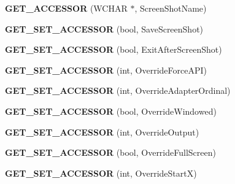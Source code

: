 \begin{DoxyCompactItemize}
\item 
\hypertarget{class_d_x_u_t_state_a7c580eede73b2b3625b5d5b40f757765}{{\bfseries G\+E\+T\+\_\+\+A\+C\+C\+E\+S\+S\+O\+R} (W\+C\+H\+A\+R $\ast$, Screen\+Shot\+Name)}\label{class_d_x_u_t_state_a7c580eede73b2b3625b5d5b40f757765}

\item 
\hypertarget{class_d_x_u_t_state_a6cc368c35ae95383e8e4bba48c1cc520}{{\bfseries G\+E\+T\+\_\+\+S\+E\+T\+\_\+\+A\+C\+C\+E\+S\+S\+O\+R} (bool, Save\+Screen\+Shot)}\label{class_d_x_u_t_state_a6cc368c35ae95383e8e4bba48c1cc520}

\item 
\hypertarget{class_d_x_u_t_state_ac2bbe60ebd3be440b9f12b5b59cb7cf6}{{\bfseries G\+E\+T\+\_\+\+S\+E\+T\+\_\+\+A\+C\+C\+E\+S\+S\+O\+R} (bool, Exit\+After\+Screen\+Shot)}\label{class_d_x_u_t_state_ac2bbe60ebd3be440b9f12b5b59cb7cf6}

\item 
\hypertarget{class_d_x_u_t_state_af3475e8ab68d3ea120cbe28eb42890e1}{{\bfseries G\+E\+T\+\_\+\+S\+E\+T\+\_\+\+A\+C\+C\+E\+S\+S\+O\+R} (int, Override\+Force\+A\+P\+I)}\label{class_d_x_u_t_state_af3475e8ab68d3ea120cbe28eb42890e1}

\item 
\hypertarget{class_d_x_u_t_state_a7cbe2c1ea6f043e22f885897980ec6d5}{{\bfseries G\+E\+T\+\_\+\+S\+E\+T\+\_\+\+A\+C\+C\+E\+S\+S\+O\+R} (int, Override\+Adapter\+Ordinal)}\label{class_d_x_u_t_state_a7cbe2c1ea6f043e22f885897980ec6d5}

\item 
\hypertarget{class_d_x_u_t_state_aeca780e3adb83245c49adbe25fc9890d}{{\bfseries G\+E\+T\+\_\+\+S\+E\+T\+\_\+\+A\+C\+C\+E\+S\+S\+O\+R} (bool, Override\+Windowed)}\label{class_d_x_u_t_state_aeca780e3adb83245c49adbe25fc9890d}

\item 
\hypertarget{class_d_x_u_t_state_a5380b95bee31d723e4cb5e90aaefd814}{{\bfseries G\+E\+T\+\_\+\+S\+E\+T\+\_\+\+A\+C\+C\+E\+S\+S\+O\+R} (int, Override\+Output)}\label{class_d_x_u_t_state_a5380b95bee31d723e4cb5e90aaefd814}

\item 
\hypertarget{class_d_x_u_t_state_a52534b577cfed421132eb0dadd278204}{{\bfseries G\+E\+T\+\_\+\+S\+E\+T\+\_\+\+A\+C\+C\+E\+S\+S\+O\+R} (bool, Override\+Full\+Screen)}\label{class_d_x_u_t_state_a52534b577cfed421132eb0dadd278204}

\item 
\hypertarget{class_d_x_u_t_state_a2f73719a7d7f24a4225b3e52a37ede27}{{\bfseries G\+E\+T\+\_\+\+S\+E\+T\+\_\+\+A\+C\+C\+E\+S\+S\+O\+R} (int, Override\+Start\+X)}\label{class_d_x_u_t_state_a2f73719a7d7f24a4225b3e52a37ede27}


\end{DoxyCompactItemize}
